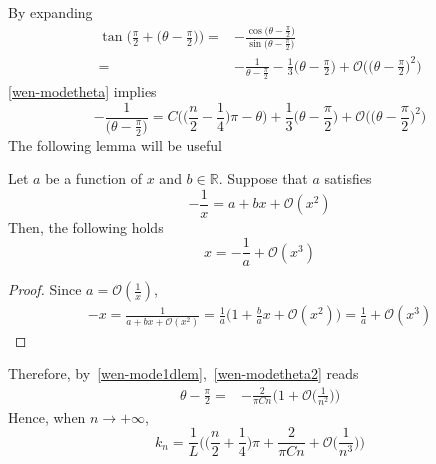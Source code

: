 By expanding
\begin{equation*}
\begin{split}
\tan\Big(\frac{\pi}{2} + \big(\theta - \frac \pi 2 \big) \Big) = &
- \frac{\cos\big(\theta-\frac{\pi}{2}\big)}{\sin\big(\theta-\frac{\pi}{2}\big)} \\
= & 
-\frac{1}{\theta - \frac \pi 2 } - \frac{1}{3}\big(\theta - \frac{\pi}{2}\big) + \mathcal{O}\Big(\big(\theta - \frac \pi 2 \big)^2\Big)
\end{split}
\end{equation*}
\cref{wen-modetheta} implies
\begin{equation}\label{wen-modetheta2}
-\frac{1}{\big(\theta - \frac \pi 2\big)} = 
C\Big( \big(\frac n 2 -\frac 1 4 \big)\pi - \theta \Big) +  \frac{1}{3}\big(\theta - \frac{\pi}{2}\big) + \mathcal{O}\Big(\big(\theta - \frac \pi 2 \big)^2\Big)
\end{equation}
The following lemma will be useful
\begin{lemma}\label{wen-mode1dlem}
Let $a$ be a function of $x$ and $b \in\mathbb{R}$.
Suppose that $a $ satisfies
\begin{equation*}
-\frac 1 x = a + bx + \mathcal{O}(x^2)
\end{equation*}
Then, the following holds
\begin{equation*}
x = -\frac 1 a + \mathcal{O}(x^3)
\end{equation*}
\end{lemma}
\begin{proof}
Since $a = \mathcal{O}(\frac 1 x) $, 
\begin{equation*}
\begin{split}
-x =  \frac{1}{a + bx + \mathcal{O}(x^2)} 
= \frac 1 a \big(1 + \frac b a x + \mathcal{O}(x^2)\big) 
=  \frac 1 a +  \mathcal{O}(x^3)
\end{split}
\end{equation*}
\end{proof}
Therefore, by~\cref{wen-mode1dlem},~\cref{wen-modetheta2} reads
\begin{equation*}
\begin{split}
\theta - \frac{\pi}{ 2} = &  -\frac{2}{\pi C n}\Big( 1 + \mathcal{O}\big( \frac{ 1}{ n^2}\big) \Big)
\end{split}
\end{equation*}
Hence, when $n\rightarrow +\infty$, 
\begin{equation*}
k_n = \frac 1 L \Big( \big( \frac n 2 + \frac 1 4 \big)\pi + \frac{2}{\pi C n}+ \mathcal{O}\big(\frac{1}{n^3}\big) \Big)
\end{equation*}
